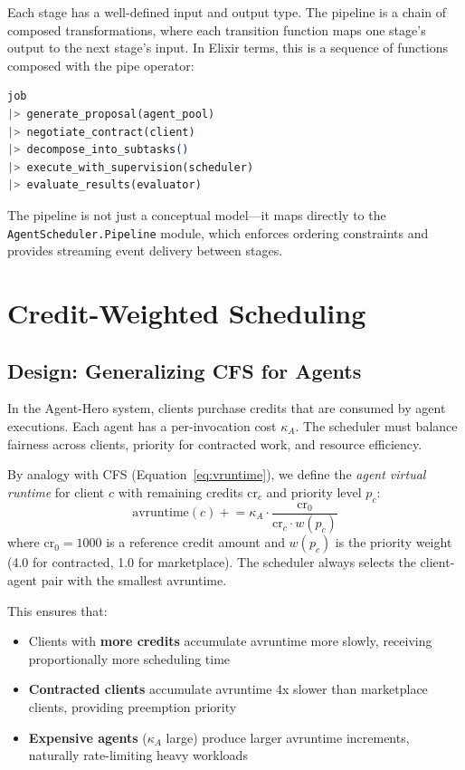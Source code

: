 \documentclass[12pt,a4paper]{article}
\theoremstyle{definition}
\theoremstyle{remark}
\begin{document}
Each stage has a well-defined input and output type. The pipeline is a chain of composed transformations, where each transition function maps one stage's output to the next stage's input. In Elixir terms, this is a sequence of functions composed with the pipe operator:

\begin{lstlisting}[language=elixir, caption={Pipeline as function composition}, label={lst:pipeline-composition}]
job
|> generate_proposal(agent_pool)
|> negotiate_contract(client)
|> decompose_into_subtasks()
|> execute_with_supervision(scheduler)
|> evaluate_results(evaluator)
\end{lstlisting}

The pipeline is not just a conceptual model---it maps directly to the \texttt{AgentScheduler.Pipeline} module, which enforces ordering constraints and provides streaming event delivery between stages.

\section{Credit-Weighted Scheduling}\label{sec:scheduling}

\subsection{Design: Generalizing CFS for Agents}

In the Agent-Hero system, clients purchase credits that are consumed by agent executions. Each agent has a per-invocation cost $\kappa_A$. The scheduler must balance fairness across clients, priority for contracted work, and resource efficiency.

By analogy with CFS (Equation~\ref{eq:vruntime}), we define the \emph{agent virtual runtime} for client $c$ with remaining credits $\text{cr}_c$ and priority level $p_c$:
\begin{equation}\label{eq:agent-vruntime}
  \text{avruntime}(c) \mathrel{+}= \kappa_A \cdot \frac{\text{cr}_0}{\text{cr}_c \cdot w(p_c)}
\end{equation}
where $\text{cr}_0 = 1000$ is a reference credit amount and $w(p_c)$ is the priority weight (4.0 for contracted, 1.0 for marketplace). The scheduler always selects the client-agent pair with the smallest avruntime.

This ensures that:
\begin{itemize}[leftmargin=2em]
  \item Clients with \textbf{more credits} accumulate avruntime more slowly, receiving proportionally more scheduling time
  \item \textbf{Contracted clients} accumulate avruntime 4x slower than marketplace clients, providing preemption priority
  \item \textbf{Expensive agents} ($\kappa_A$ large) produce larger avruntime increments, naturally rate-limiting heavy workloads
\end{itemize}
\end{document}
